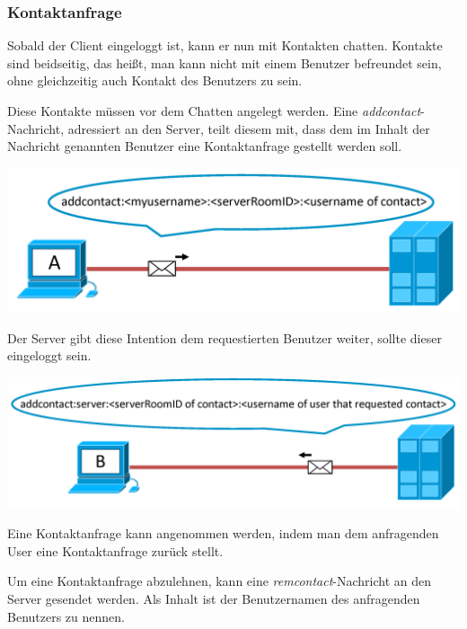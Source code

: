 \documentclass[12pt,a4paper,bibliography=totocnumbered,listof=totocnumbered]{scrartcl}
\begin{document}
\subsubsection{Kontaktanfrage}
Sobald der Client eingeloggt ist, kann er nun mit Kontakten chatten. Kontakte sind beidseitig, das heißt, man kann nicht mit einem Benutzer befreundet sein, ohne gleichzeitig auch Kontakt des Benutzers zu sein.

Diese Kontakte müssen vor dem Chatten angelegt werden. Eine \textit{addcontact}-Nachricht, adressiert an den Server, teilt diesem mit, dass dem im Inhalt der Nachricht genannten Benutzer eine Kontaktanfrage gestellt werden soll.

\vspace{1em}
\begin{minipage}{\linewidth}
	\centering
	\includegraphics[width=0.7\linewidth]{img/addcontact1.png}
	\label{fig:addcontact1}
\end{minipage}
\vspace{0.5em} 

Der Server gibt diese Intention dem requestierten Benutzer weiter, sollte dieser eingeloggt sein.

\vspace{1em}
\begin{minipage}{\linewidth}
	\centering
	\includegraphics[width=0.78\linewidth]{img/addcontact2.png}
	\label{fig:addcontact2}
\end{minipage}
\vspace{0.5em}

Eine Kontaktanfrage kann angenommen werden, indem man dem anfragenden User eine Kontaktanfrage zurück stellt.

Um eine Kontaktanfrage abzulehnen, kann eine \textit{remcontact}-Nachricht an den Server gesendet werden. Als Inhalt ist der Benutzernamen des anfragenden Benutzers zu nennen.
\end{document}
